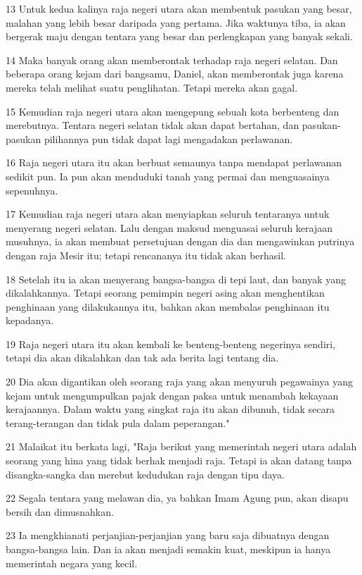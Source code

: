 \par 13 Untuk kedua kalinya raja negeri utara akan membentuk pasukan yang besar, malahan yang lebih besar daripada yang pertama. Jika waktunya tiba, ia akan bergerak maju dengan tentara yang besar dan perlengkapan yang banyak sekali.
\par 14 Maka banyak orang akan memberontak terhadap raja negeri selatan. Dan beberapa orang kejam dari bangsamu, Daniel, akan memberontak juga karena mereka telah melihat suatu penglihatan. Tetapi mereka akan gagal.
\par 15 Kemudian raja negeri utara akan mengepung sebuah kota berbenteng dan merebutnya. Tentara negeri selatan tidak akan dapat bertahan, dan pasukan-pasukan pilihannya pun tidak dapat lagi mengadakan perlawanan.
\par 16 Raja negeri utara itu akan berbuat semaunya tanpa mendapat perlawanan sedikit pun. Ia pun akan menduduki tanah yang permai dan menguasainya sepenuhnya.
\par 17 Kemudian raja negeri utara akan menyiapkan seluruh tentaranya untuk menyerang negeri selatan. Lalu dengan maksud menguasai seluruh kerajaan musuhnya, ia akan membuat persetujuan dengan dia dan mengawinkan putrinya dengan raja Mesir itu; tetapi rencananya itu tidak akan berhasil.
\par 18 Setelah itu ia akan menyerang bangsa-bangsa di tepi laut, dan banyak yang dikalahkannya. Tetapi seorang pemimpin negeri asing akan menghentikan penghinaan yang dilakukannya itu, bahkan akan membalas penghinaan itu kepadanya.
\par 19 Raja negeri utara itu akan kembali ke benteng-benteng negerinya sendiri, tetapi dia akan dikalahkan dan tak ada berita lagi tentang dia.
\par 20 Dia akan digantikan oleh seorang raja yang akan menyuruh pegawainya yang kejam untuk mengumpulkan pajak dengan paksa untuk menambah kekayaan kerajaannya. Dalam waktu yang singkat raja itu akan dibunuh, tidak secara terang-terangan dan tidak pula dalam peperangan."
\par 21 Malaikat itu berkata lagi, "Raja berikut yang memerintah negeri utara adalah seorang yang hina yang tidak berhak menjadi raja. Tetapi ia akan datang tanpa disangka-sangka dan merebut kedudukan raja dengan tipu daya.
\par 22 Segala tentara yang melawan dia, ya bahkan Imam Agung pun, akan disapu bersih dan dimusnahkan.
\par 23 Ia mengkhianati perjanjian-perjanjian yang baru saja dibuatnya dengan bangsa-bangsa lain. Dan ia akan menjadi semakin kuat, meskipun ia hanya memerintah negara yang kecil.
